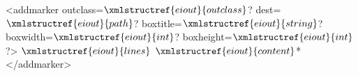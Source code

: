 <addmarker outclass=$\xmlstructref{eiout}{outclass}$? dest=$\xmlstructref{eiout}{path}$? boxtitle=$\xmlstructref{eiout}{string}$? 
            boxwidth=$\xmlstructref{eiout}{int}$? boxheight=$\xmlstructref{eiout}{int}$?>
  $\xmlstructref{eiout}{lines}$
  $\xmlstructref{eiout}{content}$*
</addmarker>
